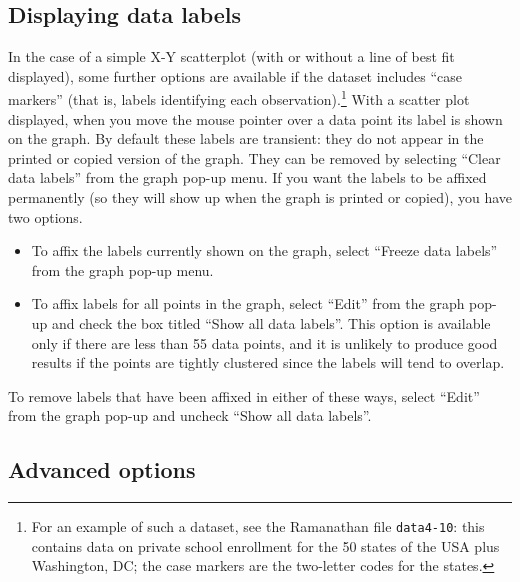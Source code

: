 \subsection{Displaying data labels}
\label{plot-labels}


      In the case of a simple X-Y scatterplot (with or without a line of best
	  fit displayed), some further options are available if the dataset
	  includes ``case markers'' (that is, labels identifying each
	  observation).\footnote{For an example of such a dataset, see
	      the Ramanathan file \verb+data4-10+: this contains
	      data on private school enrollment for the 50 states of the USA
	      plus Washington, DC; the case markers are the two-letter codes for
	      the states.} With a scatter plot displayed, when you move the mouse
	  pointer over a data point its label is shown on the graph.  By default
	  these labels are transient: they do not appear in the printed or
	  copied version of the graph.  They can be removed by selecting
	  ``Clear data labels'' from the graph pop-up menu. If you
	  want the labels to be affixed permanently (so they will show up when
	  the graph is printed or copied), you have two options.  
    
\begin{itemize}
\item To affix the labels currently shown on the graph, select
	  ``Freeze data labels'' from the graph pop-up menu.
	
\item To affix labels for all points in the graph, select
	  ``Edit'' from the graph pop-up and check the box titled
	  ``Show all data labels''.  This option is available
	  only if there are less than 55 data points, and it is unlikely
	  to produce good results if the points are tightly clustered
	  since the labels will tend to overlap.
	
\end{itemize}


      To remove labels that have been affixed in either of these ways, select
      ``Edit'' from the graph pop-up and uncheck ``Show all data
	labels''.
    

\subsection{Advanced options}
\label{plot-advanced}

